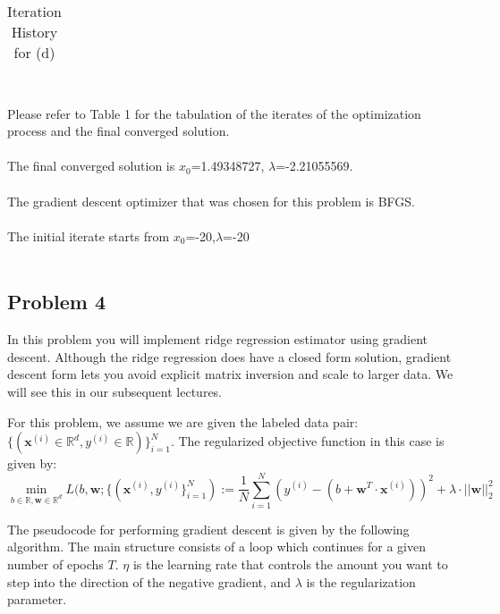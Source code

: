\documentclass[11pt]{article}
\begin{document}
{\begin{table}
\begin{tabular}{c|c}
    \end{tabular}
    \caption{Iteration History for (d)}
    \label{tab:my_label}
\end{table}
\ \\
Please refer to Table 1 for the tabulation of the iterates of the optimization process and the final converged solution.
\ \\
\ \\
The final converged solution is { $x_0$=1.49348727, $\lambda$=-2.21055569}.
\ \\
\ \\
The gradient descent optimizer that was chosen for this problem is BFGS.
\ \\
\ \\
The initial iterate starts from {$x_0$=-20,$\lambda$=-20}
\ \\
\ \\

}

\vfill

\clearpage

\subsection*{Problem 4}
In this problem you will implement ridge regression estimator using gradient descent.
Although the ridge regression does have a closed form solution, gradient descent
form lets you avoid explicit matrix inversion and scale to larger data. We will see
this in our subsequent lectures.

For this problem, we assume we are given the labeled data pair:\\
$ \{( \mathbf{x}^{(i)} \in \mathbb{R}^d, y^{(i)} \in \mathbb{R}) \}_{i= 1}^{N}$.
The regularized objective function in this case is given by:
$$\min\limits_{b\in \mathbb{R},\mathbf{w} \in \mathbb{R}^d} L(
b, \mathbf{w}; \{( \mathbf{x}^{(i)}, y^{(i)}  \}_{i= 1}^{N}
) 
:=
\frac{1}{N} \sum\limits_{i = 1}^N (y^{(i)} - ( b + \mathbf{w}^T \cdot 
\mathbf{x}^{(i)}))^2 + \lambda \cdot || \mathbf{w}||_2^2
$$

The pseudocode for performing gradient descent is given by the following algorithm.
The main structure consists of a loop which continues for a given number of epochs
$T$. $\eta$ is the learning rate that controls the amount you want to step into the 
direction of the negative gradient, and $\lambda$ is the regularization parameter.
\end{document}
